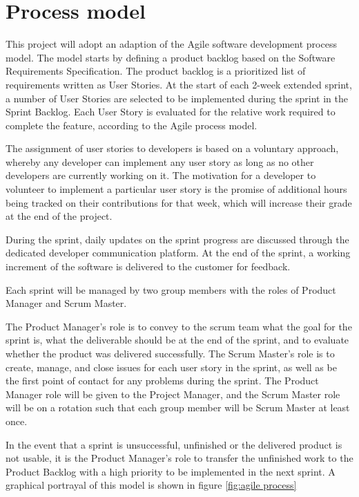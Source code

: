 \documentclass{article}
\begin{document}
\section{Process model}
This project will adopt an adaption of the Agile software development process model. The model starts by defining a product backlog based on the Software Requirements Specification. The product backlog is a prioritized list of requirements written as User Stories. At the start of each 2-week extended sprint, a number of User Stories are selected to be implemented during the sprint in the Sprint Backlog. Each User Story is evaluated for the relative work required to complete the feature, according to the Agile process model.

The assignment of user stories to developers is based on a voluntary approach, whereby any developer can implement any user story as long as no other developers are currently working on it. The motivation for a developer to volunteer to implement a particular user story is the promise of additional hours being tracked on their contributions for that week, which will increase their grade at the end of the project.

During the sprint, daily updates on the sprint progress are discussed through the dedicated developer communication platform. At the end of the sprint, a working increment of the software is delivered to the customer for feedback.

Each sprint will be managed by two group members with the roles of Product Manager and Scrum Master. 

The Product Manager's role is to convey to the scrum team what the goal for the sprint is, what the deliverable should be at the end of the sprint, and to evaluate whether the product was delivered successfully. The Scrum Master's role is to create, manage, and close issues for each user story in the sprint, as well as be the first point of contact for any problems during the sprint. The Product Manager role will be given to the Project Manager, and the Scrum Master role will be on a rotation such that each group member will be Scrum Master at least once.

In the event that a sprint is unsuccessful, unfinished or the delivered product is not usable, it is the Product Manager's role to transfer the unfinished work to the Product Backlog with a high priority to be implemented in the next sprint. A graphical portrayal of this model is shown in figure \ref{fig:agile process}
\end{document}
